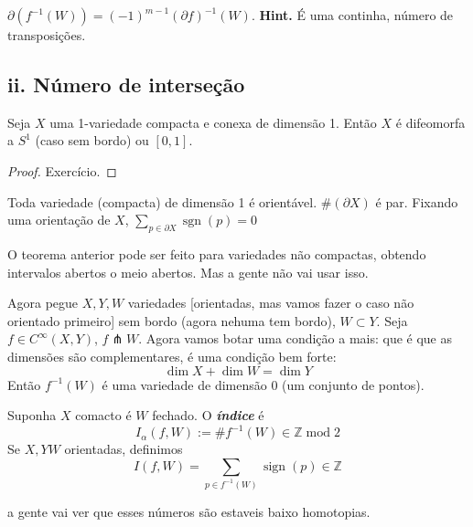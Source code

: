 \begin{exercise}\leavevmode
\(\partial (f^{-1}(W)) = (-1)^{m-1}(\partial f)^{-1}(W)\). \textbf{Hint.} É uma continha, número de transposições.
\end{exercise}

\subsection{ii. Número de interseção}

\begin{thm}\leavevmode
	Seja \(X\) uma 1-variedade compacta e conexa de dimensão 1. Então \(X\) é difeomorfa a \(S^1\) (caso sem bordo) ou \([0,1]\).
\end{thm}

\begin{proof}\leavevmode
Exercício.
\end{proof}

\begin{coro}\leavevmode
Toda variedade (compacta) de dimensão 1 é orientável. \(\# (\partial X)\) é par. Fixando uma orientação de \(X\), \(\sum_{p \in \partial X}\operatorname{sgn}(p)=0\)
\end{coro}

\begin{remark}\leavevmode
O teorema anterior pode ser feito para variedades não compactas, obtendo intervalos abertos o meio abertos. Mas a gente não vai usar isso.
\end{remark}

Agora pegue \(X,Y,W\) variedades [orientadas, mas vamos fazer o caso não orientado primeiro] sem bordo (agora nehuma tem bordo), \(W \subset Y\). Seja \(f \in C^\infty (X,Y)\), \(f \pitchfork  W\). Agora vamos botar uma condição a mais: que é  que as dimensões são complementares, é uma condição bem forte:
\[\dim X+ \dim W=\dim Y\]
Então \(f^{-1}(W)\) é uma variedade de dimensão 0 (um conjunto de pontos).

\begin{defn}\leavevmode
Suponha \(X\) comacto é \(W\) fechado.	O \textit{\textbf{índice}} é 
	\[I_\alpha(f,W) := \# f^{-1}(W) \in \mathbb{Z} \operatorname{ mod}2\]
Se \(X, Y W \) orientadas, definimos
\[I(f,W) = \sum _{p \in f^{-1}(W)}\operatorname{sign}(p) \in \mathbb{Z}\]

\end{defn}

a gente vai ver que esses números são estaveis baixo homotopias.

